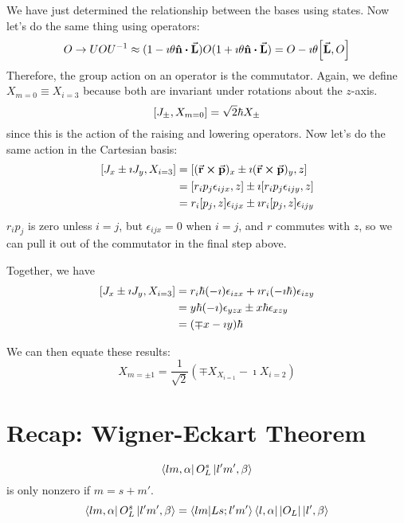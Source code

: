 \documentclass[a4paper,twoside,master.tex]{subfiles}
\begin{document}
We have just determined the relationship between the bases using states. Now let's do the same thing using operators:
\begin{equation}
    O \to U O U^{-1} \approx (1 - \imath \theta \vu{n} \vdot \va{L}) O (1 + \imath \theta \vu{n} \vdot \va{L}) = O - \imath \theta \comm{\va{L}}{O}
\end{equation}
Therefore, the group action on an operator is the commutator. Again, we define $ X_{m=0} \equiv X_{i=3} $ because both are invariant under rotations about the $ z $-axis.
\begin{equation}
    \comm{J_{\pm}}{X_{m=0}} = \sqrt{2} \hbar X_{\pm}
\end{equation}
since this is the action of the raising and lowering operators. Now let's do the same action in the Cartesian basis:
\begin{align}
    \comm{J_x \pm \imath J_y}{X_{i=3}} &= \comm{(\va{r} \cross \va{p})_x \pm \imath (\va{r} \cross \va{p})_y}{z} \\
    &= \comm{r_i p_j \epsilon_{ijx}}{z} \pm \imath \comm{r_i p_j \epsilon_{ijy}}{z} \\
    &= r_i \comm{p_j}{z} \epsilon_{ijx} \pm \imath r_i \comm{p_j}{z} \epsilon_{ijy}
\end{align}
$ r_i p_j $ is zero unless $ i=j $, but $ \epsilon_{ijx} = 0 $ when $ i=j $, and $ r $ commutes with $ z $, so we can pull it out of the commutator in the final step above.

Together, we have
\begin{align}
    \comm{J_x \pm \imath J_y}{X_{i=3}} &= r_i \hbar (- \imath) \epsilon_{izx} + \imath r_i (- \imath \hbar) \epsilon_{izy} \\
    &= y \hbar (- \imath) \epsilon_{yzx} \pm x \hbar \epsilon_{xzy} \\
    &= (\mp x - \imath y) \hbar
\end{align}

We can then equate these results:
\begin{equation}
    X_{m=\pm 1} = \frac{1}{\sqrt{2}} \left( \mp X_{X_{i=1}} - \imath X_{i=2} \right)
\end{equation}

\section{Recap: Wigner-Eckart Theorem}
\label{sec:recap_wigner-eckart_theorem}

\begin{equation}
    \bra{lm, \alpha} O^s_L\ket{l'm', \beta}
\end{equation}
is only nonzero if $ m = s+m' $.
\begin{equation}
    \bra{lm, \alpha} O^s_L\ket{l'm', \beta} =\bra{lm}\ket{Ls;l'm'}\bra{l, \alpha} |O_L|\ket{l', \beta}
\end{equation}
\end{document}
